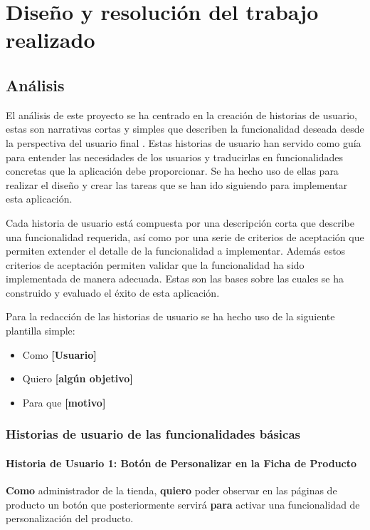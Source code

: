 \documentclass[11pt]{article}
\newcommand{\subsubsubsection}[1]{\paragraph{#1}}
\begin{document}
\clearpage
\section{Diseño y resolución del trabajo realizado}

\subsection{Análisis}
El análisis de este proyecto se ha centrado en la creación de historias de usuario, estas son narrativas 
cortas y simples que describen la funcionalidad deseada desde la perspectiva del usuario final \cite{hu}. 
Estas historias de usuario han servido como guía para entender las necesidades de los usuarios y traducirlas en 
funcionalidades concretas que la aplicación debe proporcionar. Se ha hecho uso de ellas para realizar el diseño y crear
las tareas que se han ido siguiendo para implementar esta aplicación.

Cada historia de usuario está compuesta por una descripción corta que describe una funcionalidad requerida, así como por una serie de criterios de aceptación que 
permiten extender el detalle de la funcionalidad a implementar. Además estos criterios de aceptación permiten validar que la funcionalidad 
ha sido implementada de manera adecuada. Estas son las bases sobre las cuales se ha construido y evaluado el éxito de esta aplicación.

Para la redacción de las historias de usuario se ha hecho uso de la siguiente plantilla simple:

\begin{itemize}
    \item Como \textbf{[Usuario]}
    \item Quiero \textbf{[algún objetivo]}
    \item Para que \textbf{[motivo]}
\end{itemize}


\subsubsection{Historias de usuario de las funcionalidades básicas}

\subsubsubsection{Historia de Usuario 1: Botón de Personalizar en la Ficha de Producto}\label{sec:historia1}

\textbf{Como} administrador de la tienda, \textbf{quiero} poder observar en las páginas de producto un botón que posteriormente servirá \textbf{para} activar una funcionalidad de personalización del producto.
\end{document}
